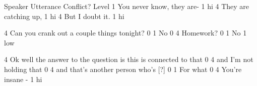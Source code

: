 Speaker	Utterance	Conflict?	Level
1	You never know, they are-	1	hi
4	They are catching up, 	1	hi
4	But I doubt it.	1	hi
			
4	Can you crank out a couple things tonight?	0	
1	No	0	
4	Homework?	0	
1	No	1	low
			
4	Ok well the answer to the question is this is connected to that  	0	
4	and I'm not holding that	0	
4	and that's another person who's [?]	0	
1	For what	0	
4	You're insane - 	1	hi
